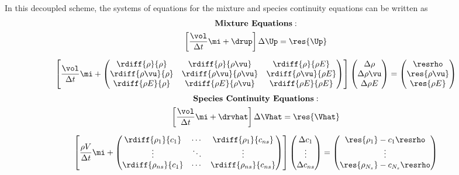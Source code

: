 In this decoupled scheme, the systems of equations for the mixture and species
continuity equations can be written as
\begin{gather}
  \begin{gathered}
    \text{\bf{Mixture Equations}}: \\
    \left[ 
    \frac{\vol}{\Delta t}\mi + \drup
    \right] \Delta \Up
  =
  \res{\Up}
  \end{gathered}
  \label{approx-dc-flow-mixture} \\[6pt]
  \left[ 
    \frac{\vol}{\Delta t}\mi + 
    \begin{pmatrix}
      \rdiff{\rho}{\rho} & \rdiff{\rho}{\rho \vu} & \rdiff{\rho}{\rho E} \\
      \rdiff{\rho \vu}{\rho} & \rdiff{\rho \vu}{\rho \vu} & \rdiff{\rho \vu}{\rho E} \\
      \rdiff{\rho E}{\rho} & \rdiff{\rho E}{\rho \vu} & \rdiff{\rho E}{\rho E}
    \end{pmatrix}
  \right]
  \begin{pmatrix}
    \Delta \rho \\
    \Delta \rho \vu \\
    \Delta \rho E
  \end{pmatrix}
  =
  \begin{pmatrix}
    \resrho \\
    \res{\rho \vu} \\
    \res{\rho E}
  \end{pmatrix}
  \label{approx-jac}
\end{gather}
\begin{gather}
  \begin{gathered}
    \text{\bf{Species Continuity Equations}}: \\
    \left[ 
    \frac{\vol}{\Delta t}\mi + \drvhat
    \right] \Delta \Vhat
    =
    \res{\Vhat}
  \end{gathered} \label{approx-dc-flow-species} \\[6pt]
  \left[
    \frac{\rho V}{\Delta t}\mi + 
    \begin{pmatrix}
      \rdiff{\rho_1}{c_1} & \cdots & \rdiff{\rho_{1}}{c_{ns}} \\
      \vdots & \ddots & \vdots \\
      \rdiff{\rho_{ns}}{c_1} & \cdots & \rdiff{\rho_{ns}}{c_{ns}}
    \end{pmatrix}
  \right]
  \begin{pmatrix}
    \Delta c_1 \\
    \vdots \\
    \Delta c_{ns}
  \end{pmatrix}
  =
  \begin{pmatrix}
    \res{\rho_1} - c_1 \resrho \\
    \vdots \\
    \res{\rho_{N_s}} - c_{N_s} \resrho
  \end{pmatrix}
  \label{approx-jac-dc}
\end{gather}
